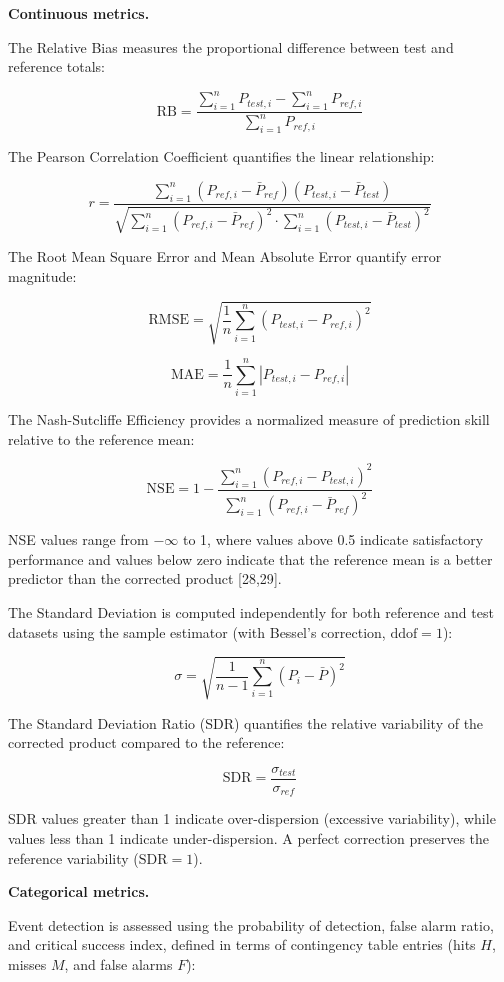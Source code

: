 \documentclass[
]{article}
\begin{document}
\textbf{Continuous metrics.}

The Relative Bias measures the proportional difference between test and
reference totals:

\[\text{RB} = \frac{\sum_{i=1}^{n} P_{test,i} - \sum_{i=1}^{n} P_{ref,i}}{\sum_{i=1}^{n} P_{ref,i}}\]

The Pearson Correlation Coefficient quantifies the linear relationship:

\[r = \frac{\sum_{i=1}^{n}(P_{ref,i} - \bar{P}_{ref})(P_{test,i} - \bar{P}_{test})}{\sqrt{\sum_{i=1}^{n}(P_{ref,i} - \bar{P}_{ref})^2 \cdot \sum_{i=1}^{n}(P_{test,i} - \bar{P}_{test})^2}}\]

The Root Mean Square Error and Mean Absolute Error quantify error
magnitude:

\[\text{RMSE} = \sqrt{\frac{1}{n} \sum_{i=1}^{n} (P_{test,i} - P_{ref,i})^2}\]

\[\text{MAE} = \frac{1}{n} \sum_{i=1}^{n} |P_{test,i} - P_{ref,i}|\]

The Nash-Sutcliffe Efficiency provides a normalized measure of
prediction skill relative to the reference mean:

\[\text{NSE} = 1 - \frac{\sum_{i=1}^{n}(P_{ref,i} - P_{test,i})^2}{\sum_{i=1}^{n}(P_{ref,i} - \bar{P}_{ref})^2}\]

NSE values range from \(-\infty\) to 1, where values above 0.5 indicate
satisfactory performance and values below zero indicate that the
reference mean is a better predictor than the corrected product
{[}28,29{]}.

The Standard Deviation is computed independently for both reference and
test datasets using the sample estimator (with Bessel's correction,
\(\text{ddof} = 1\)):

\[\sigma = \sqrt{\frac{1}{n-1} \sum_{i=1}^{n} (P_i - \bar{P})^2}\]

The Standard Deviation Ratio (SDR) quantifies the relative variability
of the corrected product compared to the reference:

\[\text{SDR} = \frac{\sigma_{test}}{\sigma_{ref}}\]

SDR values greater than 1 indicate over-dispersion (excessive
variability), while values less than 1 indicate under-dispersion. A
perfect correction preserves the reference variability
(\(\text{SDR} = 1\)).

\textbf{Categorical metrics.}

Event detection is assessed using the probability of detection, false
alarm ratio, and critical success index, defined in terms of contingency
table entries (hits \(H\), misses \(M\), and false alarms \(F\)):
\end{document}
